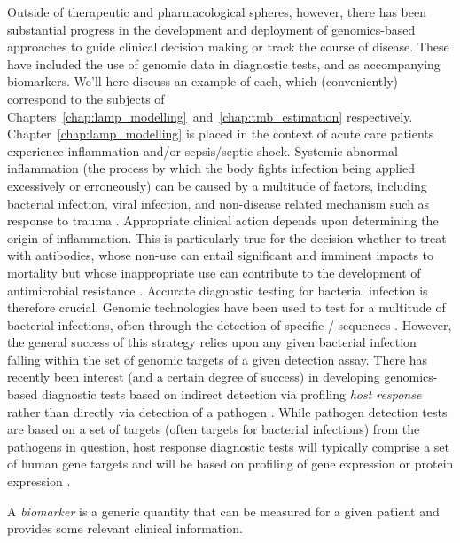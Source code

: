 \documentclass[thesis.tex]{subfiles}
\begin{document}
Outside of therapeutic and pharmacological spheres, however, there has been substantial progress in the development and deployment of genomics-based approaches to guide clinical decision making or track the course of disease. These have included the use of genomic data in diagnostic tests, and as accompanying biomarkers. We'll here discuss an example of each, which (conveniently) correspond to the subjects of Chapters~\ref{chap:lamp_modelling}~and~\ref{chap:tmb_estimation} respectively. Chapter~\ref{chap:lamp_modelling} is placed in the context of acute care patients experience inflammation and/or sepsis/septic shock. Systemic abnormal inflammation (the process by which the body fights infection being applied excessively or erroneously) can be caused by a multitude of factors, including bacterial infection, viral infection, and non-disease related mechanism such as response to trauma \citep{chen_inflammatory_2017}. Appropriate clinical action depends upon determining the origin of inflammation. This is particularly true for the decision whether to treat with antibodies, whose non-use can entail significant and imminent impacts to mortality \citep{liu_timing_2017} but whose inappropriate use can contribute to the development of antimicrobial resistance \citep{fitzpatrick_sepsis_2019}. Accurate diagnostic testing for bacterial infection is therefore crucial. Genomic technologies have been used to test for a multitude of bacterial infections, often through the detection of specific / sequences \citep{fournier_clinical_2014}. However, the general success of this strategy relies upon any given bacterial infection falling within the set of genomic targets of a given detection assay. There has recently been interest (and a certain degree of success) in developing genomics-based diagnostic tests based on indirect detection via profiling \emph{host response} rather than directly via detection of a pathogen \citep{safarika_29-mrna_2021, kelly_systematic_2022}. While pathogen detection tests are based on a set of targets (often  targets for bacterial infections) from the pathogens in question, host response diagnostic tests will typically comprise a set of human gene targets and will be based on profiling of gene expression \citep{ram-mohan_using_2022} or protein expression \citep{vanderboom_proteomic_2021}.

A \emph{biomarker} is a generic quantity that can be measured for a given patient and provides some relevant clinical information. 
\end{document}
